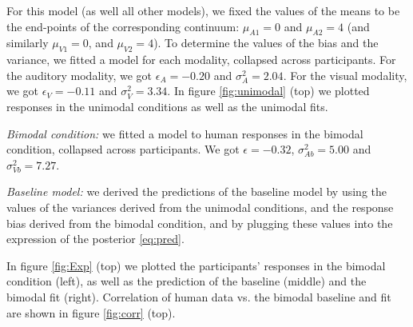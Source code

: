 \documentclass[10pt,letterpaper]{article}
\begin{document}
For this model (as well all other models), we fixed the values of the means to be the end-points of the corresponding continuum: $\mu_{A1}=0$ and $\mu_{A2}=4$ (and similarly $\mu_{V1}=0$, and $\mu_{V2}=4$). To determine the values of the bias and the variance, we fitted a model for each modality, collapsed across participants. For the auditory modality, we got $\epsilon_A=-0.20$ and $\sigma^2_A=2.04$. For the visual modality, we got $\epsilon_V=-0.11$ and $\sigma^2_V=3.34$.  In figure \ref{fig:unimodal} (top) we plotted responses in the unimodal conditions as well as the unimodal fits.

\textit{Bimodal condition:} we fitted a model to human responses in the bimodal condition, collapsed across participants. We got $\epsilon=-0.32$, $\sigma^2_{Ab}=5.00$ and $\sigma^2_{Vb}=7.27$.

\textit{Baseline model:} we derived the predictions of the baseline model by using the values of the variances derived from the unimodal conditions, and the response bias derived from the bimodal condition, and by plugging these values into the expression of the posterior \ref{eq:pred}.

In figure \ref{fig:Exp} (top) we plotted the participants' responses in the bimodal condition (left), as well as the prediction of the baseline (middle) and the bimodal fit (right). Correlation of human data vs. the bimodal baseline and fit are shown in figure \ref{fig:corr} (top).
\end{document}
